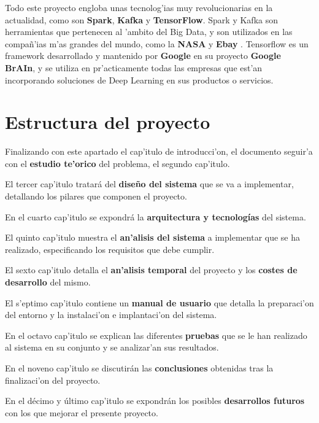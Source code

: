 Todo este proyecto engloba unas tecnolog'ias muy revolucionarias en la actualidad, como son \textbf{Spark}, \textbf{Kafka} y \textbf{TensorFlow}. Spark y Kafka son herramientas que pertenecen al 'ambito del Big Data, y son utilizados en las compañ'ias m'as grandes del mundo, como la \textbf{NASA} y \textbf{Ebay} \cite{motivacion}. Tensorflow es un framework desarrollado y mantenido por \textbf{Google} en su proyecto \textbf{Google BrAIn}, y se utiliza en pr'acticamente todas las empresas que est'an incorporando soluciones de Deep Learning en sus productos o servicios.

 

\section{Estructura del proyecto}\label{sec:estructura}
Finalizando con este apartado el cap'itulo de introducci'on, el documento seguir'a con el \textbf{estudio te'orico} del problema, el segundo cap'itulo.

El tercer cap'itulo tratará del \textbf{diseño del sistema} que se va a implementar, detallando los pilares que componen el proyecto. 

En el cuarto cap'itulo se expondrá la \textbf{arquitectura y tecnologías} del sistema.

El quinto cap'itulo muestra el \textbf{an'alisis del sistema} a implementar que se ha realizado, especificando los requisitos que debe cumplir.

El sexto cap'itulo detalla el \textbf{an'alisis temporal} del proyecto y los \textbf{costes de desarrollo} del mismo.

El s'eptimo cap'itulo contiene un \textbf{manual de usuario} que detalla la preparaci'on del entorno y la instalaci'on e implantaci'on del sistema.

En el octavo cap'itulo se explican las diferentes \textbf{pruebas} que se le han realizado al sistema en su conjunto y se analizar'an sus resultados.

En el noveno cap'itulo se discutirán las \textbf{conclusiones} obtenidas tras la finalizaci'on del proyecto.

En el décimo y último cap'itulo se expondrán los posibles \textbf{desarrollos futuros} con los que mejorar el presente proyecto.

